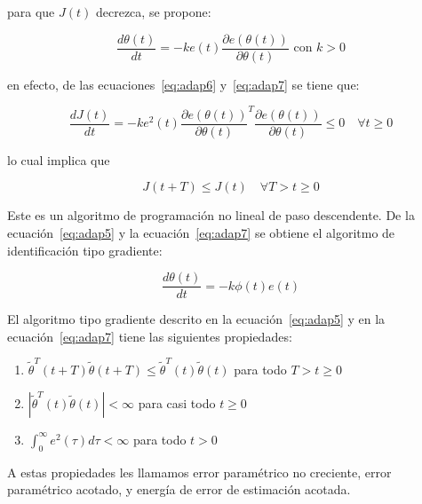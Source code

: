            para que $J(t)$ decrezca, se propone:

            \begin{equation}\label{eq:adap7}
                \frac{d \theta(t)}{dt} = -k e(t) \frac{\partial e(\theta(t))}{\partial \theta(t)} \text{ con } k > 0
            \end{equation}

            en efecto, de las ecuaciones~\ref{eq:adap6} y~\ref{eq:adap7} se tiene que:

            \begin{equation*}
                \frac{d J(t)}{dt} = -k e^2(t) \frac{\partial e(\theta(t))}{\partial \theta(t)}^T \frac{\partial e(\theta(t))}{\partial \theta(t)} \le 0 \quad \forall t \ge 0
            \end{equation*}

            lo cual implica que

            \begin{equation}
                J(t + T) \le J(t) \quad \forall T > t \ge 0
            \end{equation}

            Este es un algoritmo de programación no lineal de paso descendente.
            De la ecuación~\ref{eq:adap5} y la ecuación~\ref{eq:adap7} se obtiene el algoritmo de identificación tipo gradiente:

            \begin{equation} \label{eq:adap7}
                \frac{d \theta(t)}{dt} = -k \phi(t)e(t)
            \end{equation}


            \begin{lema}
                El algoritmo tipo gradiente descrito en la ecuación~\ref{eq:adap5} y en la ecuación~\ref{eq:adap7} tiene las siguientes propiedades:

                \begin{enumerate}
                    \item $\tilde{\theta}^T(t + T) \tilde{\theta}(t + T) \le \tilde{\theta}^T(t) \tilde{\theta}(t)$ para todo $T > t \ge 0$
                    \item $\left| \tilde{\theta}^T(t) \tilde{\theta}(t) \right| < \infty$ para casi todo $t \ge 0$
                    \item $\int_0^{\infty} e^2(\tau) d\tau < \infty$ para todo $t > 0$
                \end{enumerate}

                A estas propiedades les llamamos error paramétrico no creciente, error paramétrico acotado, y energía de error de estimación acotada.
            \end{lema}

